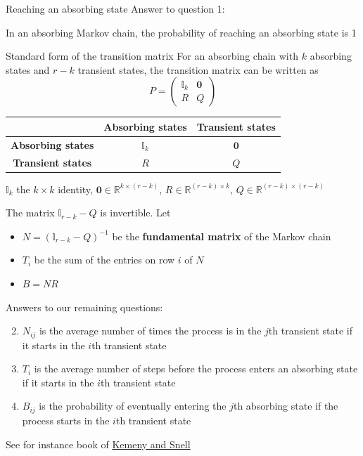 \documentclass[aspectratio=169]{beamer}
\begin{document}
\begin{frame}{Reaching an absorbing state}
    Answer to question 1:
    \begin{theorem}
        In an absorbing Markov chain, the probability of reaching an absorbing state is 1
    \end{theorem}
\end{frame}

\begin{frame}{Standard form of the transition matrix}
    For an absorbing chain with $k$ absorbing states and $r-k$ transient states, the transition matrix can be written as
    $$
    P=\begin{pmatrix}
    \mathbb{I}_k & \mathbf{0} \\
    R & Q
    \end{pmatrix}
    $$
    
    \begin{center}
        \begin{tabular}{c|c|c|}
            & Absorbing states & Transient states \\
            \hline
            \textbf{Absorbing states} & $\mathbb{I}_k$ & $\mathbf{0}$ \\
            \textbf{Transient states} & $R$ & $Q$ 
        \end{tabular}
    \end{center}
    \vfill
    $\mathbb{I}_k$ the $k\times k$ identity, $\mathbf{0}\in\mathbb{R}^{k\times(r-k)}$, $R\in\mathbb{R}^{(r-k)\times k}$, $Q\in\mathbb{R}^{(r-k)\times(r-k)}$
\end{frame}


\begin{frame}
    The matrix $\mathbb{I}_{r-k}-Q$ is invertible. Let
\begin{itemize}
    \item $N=(\mathbb{I}_{r-k}-Q)^{-1}$ be the \textbf{fundamental matrix} of the Markov chain
    \item $T_i$ be the sum of the entries on row $i$ of $N$
    \item $B=NR$
\end{itemize}
\vfill
Answers to our remaining questions:

\begin{enumerate}
    \setcounter{enumi}{1}
    \item $N_{ij}$ is the average number of times the process is in the $j$th transient state if it starts in the $i$th transient state
    \item $T_i$ is the average number of steps before the process enters an absorbing state if it starts in the $i$th transient state
    \item $B_{ij}$ is the probability of eventually entering the $j$th absorbing state if the process starts in the $i$th transient state
\end{enumerate}
\vfill
See for instance book of \href{https://www.amazon.com/Finite-Markov-Chains-Laurie-Kemeny/dp/B000KYES0O}{Kemeny and Snell}
\end{frame}
\end{document}
